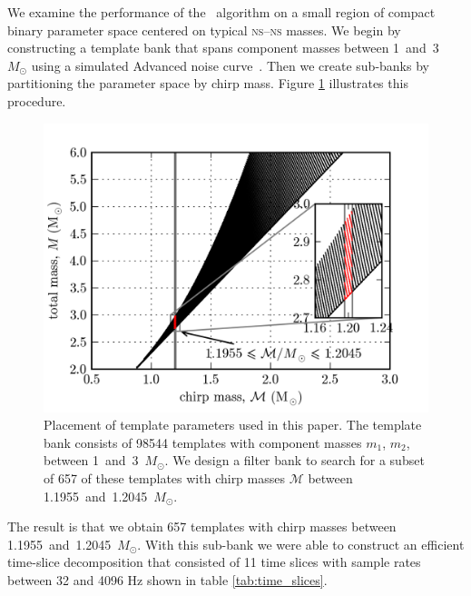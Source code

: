 We examine the performance of the \lloid\ algorithm on a small region of
compact binary parameter space centered on typical \textsc{ns}--\textsc{ns}
masses.  We begin by constructing a template bank that spans component masses
between 1~and~3~$M_\odot$ using a simulated Advanced \LIGO{} noise
curve~\cite{lal}.  Then we create sub-banks by partitioning the parameter space by
chirp mass.  Figure \ref{fig:tmpltbank} illustrates this procedure.
\begin{figure}[htbp]
	\begin{center}
		\includegraphics{figures/tmpltbank.png}
		\caption{\label{fig:tmpltbank}Placement of template parameters used in this paper.  The template bank consists of 98544 templates with component masses $m_1$, $m_2$, between 1~and~3~$M_\odot$.  We design a filter bank to search for a subset of 657 of these templates with chirp masses $\mathcal M$ between 1.1955~and~1.2045~$M_\odot$.}
	\end{center}
\end{figure}
The result is that we obtain 657 templates with chirp masses between 1.1955~and~1.2045~$M_\odot$.  With this
sub-bank we were able to construct an efficient time-slice decomposition that consisted of 11 time slices
with sample rates between 32 and 4096 Hz shown in table \ref{tab:time_slices}.
